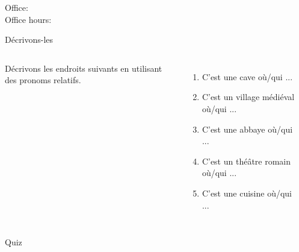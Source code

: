 \documentclass{beamer}
\subtitle[Sites et \lexi{où} et \lexi{qui}]{Les sites et les relatifs \lexi{où} et \lexi{qui}}
\begin{document}
  \begin{frame}
    \titlepage
    \tiny{Office: \\
          Office hours: }
  \end{frame}

  \begin{frame}[t]{Décrivons-les}
    \begin{columns}
        Décrivons les endroits suivants en utilisant des pronoms relatifs.
        \begin{enumerate}
          \item C'est une cave où/qui ...
          \item<2-> C'est un village médiéval où/qui ...
          \item<3-> C'est une abbaye où/qui ...
          \item<4-> C'est un théâtre romain où/qui ...
          \item<5-> C'est une cuisine où/qui ...
        \end{enumerate}
        \begin{minipage}[c][0.8\textheight]{\linewidth}
          \begin{center}
          \end{center}
        \end{minipage}
    \end{columns}
  \end{frame}

  \begin{frame}{}
    \begin{center}
      \Large Quiz
    \end{center}
  \end{frame}
\end{document}
